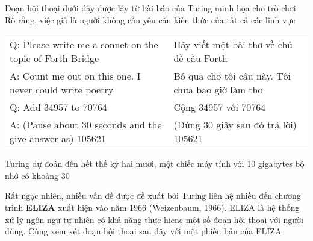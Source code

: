 Đoạn hội thoại dưới đấy được lấy từ bài báo của Turing minh họa cho trò chơi. Rõ rằng, việc giả là người không cần yêu cầu kiến thức của tất cả các lĩnh vực

\vspace{1em}
\hspace*{-6em}
\colorbox{background}{
\begin{tabular}{ l | l}
  Q: Please write me a sonnet on the topic of Forth Bridge  & Hãy viết một bài thơ về chủ đề cầu Forth \\
  A: Count me out on this one. I never could write poetry & Bỏ qua cho tôi câu này. Tôi chưa bao giờ làm thơ \\
  Q: Add 34957 to 70764 & Cộng 34957 với 70764\\
  A: (Pause about 30 seconds and the give answer as) 105621 & (Dừng 30 giây sau đó trả lời) 105621 \\
\end{tabular}
}


Turing dự đoán đến hết thế kỷ hai mươi, một chiếc máy tính với 10 gigabytes bộ nhớ có khoảng 30%

Rất ngạc nhiên, nhiều vấn đề được đề xuất bởi Turing liên hệ nhiều đến chương trình \textbf{ELIZA} xuất hiện vào năm 1966 (Weizenbaum, 1966). ELIZA là hệ thống xử lý ngôn ngữ tự nhiên có khả năng thực hienẹ một số đoạn hội thoại với người dùng. Cùng xem xét đoạn hội thoại sau đây với một phiên bản của ELIZA

